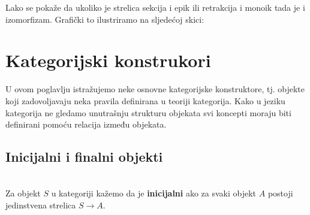     Lako se pokaže da ukoliko je strelica sekcija i epik ili retrakcija i
    monoik tada je i izomorfizam.
    Grafički to ilustriramo na sljedećoj skici:
    \begin{center}
    \end{center}
    
  \newpage
  \section{Kategorijski konstrukori}
  U ovom poglavlju istražujemo neke osnovne kategorijske
  konstruktore, tj. objekte koji zadovoljavaju neka pravila definirana u teoriji
  kategorija. Kako u jeziku kategorija ne gledamo unutrašnju strukturu objekata
  svi koncepti moraju biti definirani pomoću relacija između objekata.
  \subsection{Inicijalni i finalni objekti}

  \begin{definition}\ \\
  
    \noindent Za objekt $S$ u kategoriji  kažemo da je \textbf{inicijalni} ako za svaki
    objekt $A$ postoji jedinstvena strelica $S \xrightarrow{} A$.\\
  \end{definition}
  
